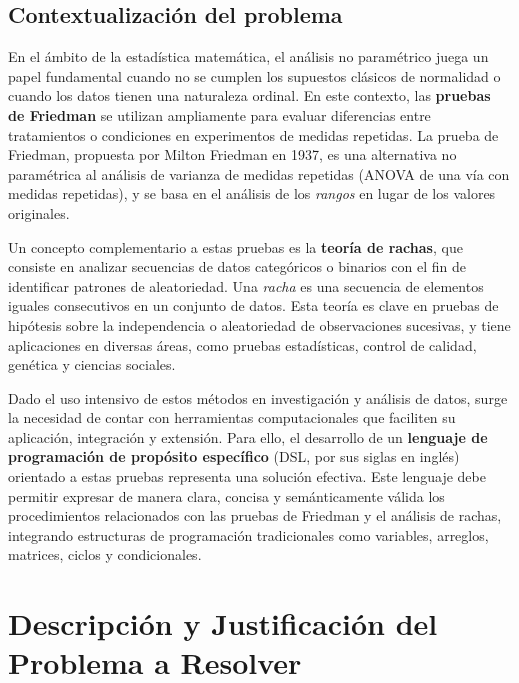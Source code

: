 \documentclass{article}
\begin{document}
\subsection{Contextualización del problema}

En el ámbito de la estadística matemática, el análisis no paramétrico juega un papel fundamental cuando no se cumplen los supuestos clásicos de normalidad o cuando los datos tienen una naturaleza ordinal. En este contexto, las \textbf{pruebas de Friedman} se utilizan ampliamente para evaluar diferencias entre tratamientos o condiciones en experimentos de medidas repetidas. La prueba de Friedman, propuesta por Milton Friedman en 1937, es una alternativa no paramétrica al análisis de varianza de medidas repetidas (ANOVA de una vía con medidas repetidas), y se basa en el análisis de los \emph{rangos} en lugar de los valores originales.

Un concepto complementario a estas pruebas es la \textbf{teoría de rachas}, que consiste en analizar secuencias de datos categóricos o binarios con el fin de identificar patrones de aleatoriedad. Una \emph{racha} es una secuencia de elementos iguales consecutivos en un conjunto de datos. Esta teoría es clave en pruebas de hipótesis sobre la independencia o aleatoriedad de observaciones sucesivas, y tiene aplicaciones en diversas áreas, como pruebas estadísticas, control de calidad, genética y ciencias sociales.

Dado el uso intensivo de estos métodos en investigación y análisis de datos, surge la necesidad de contar con herramientas computacionales que faciliten su aplicación, integración y extensión. Para ello, el desarrollo de un \textbf{lenguaje de programación de propósito específico} (DSL, por sus siglas en inglés) orientado a estas pruebas representa una solución efectiva. Este lenguaje debe permitir expresar de manera clara, concisa y semánticamente válida los procedimientos relacionados con las pruebas de Friedman y el análisis de rachas, integrando estructuras de programación tradicionales como variables, arreglos, matrices, ciclos y condicionales.



\section{Descripción y Justificación del Problema a Resolver}\label{sec:descr}
\end{document}
